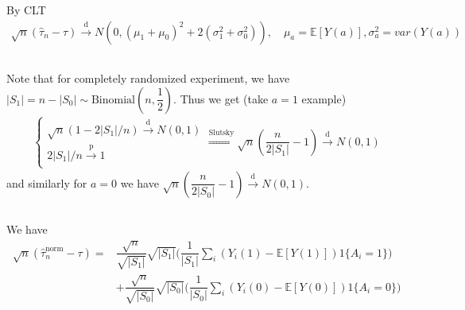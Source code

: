 \documentclass[11pt,a4paper]{ctexart}
\numberwithin{equation}{section}%
\begin{document}
By CLT
\begin{align*}
    \sqrt{n}(\hat{\tau}_n-\tau) \xrightarrow[]{\mathrm{d}} N(0, (\mu _1 + \mu _0)^2 + 2(\sigma _1^2 + \sigma _0^2)),\quad \mu _a = \mathbb{E}\left[ Y(a) \right],\sigma _a^2 = var(Y(a))
\end{align*}



\subsection{}







Note that for completely randomized experiment, we have $ \left\vert S_1 \right\vert = n- \left\vert S_0 \right\vert \sim \mathrm{ Binomial }(n, \dfrac{ 1 }{ 2 }) $. Thus we get (take $ a=1 $ example)
\begin{align*}
    \begin{cases}
        \sqrt{n}(1-2\left\vert S_1 \right\vert /n ) \xrightarrow[]{\mathrm{d}} N(0, 1)\\
        2\left\vert S_1 \right\vert /n \xrightarrow[]{\mathrm{p}} 1
    \end{cases} \mathop{  \Rightarrow  }\limits^{\mathrm{ Slutsky }} \sqrt{n}(\dfrac{ n  }{ 2\left\vert S_1\right\vert }    -1 ) \xrightarrow[]{\mathrm{d}} N(0, 1)  
\end{align*}
and similarly for $ a=0 $ we have $ \sqrt{n}(\dfrac{ n  }{ 2\left\vert S_0\right\vert }    -1 ) \xrightarrow[]{\mathrm{d}} N(0, 1)  $.




\subsection{}


We have
\begin{align*}
    \sqrt{n}(\hat{\tau}_n^\mathrm{ norm } -\tau) = &\dfrac{ \sqrt{n} }{ \sqrt{\left\vert S_1 \right\vert } }  \sqrt{\left\vert S_1 \right\vert } \big( \dfrac{ 1 }{ \left\vert S_1 \right\vert  }\sum_i (Y_i(1) - \mathbb{E}\left[ Y(1) \right] )1\{A_i=1\}    \big) \\ & + \dfrac{ \sqrt{n} }{ \sqrt{\left\vert S_0 \right\vert } }  \sqrt{\left\vert S_0 \right\vert } \big( \dfrac{ 1 }{ \left\vert S_0 \right\vert  }\sum_i (Y_i(0) - \mathbb{E}\left[ Y(0) \right] )1\{A_i=0\}    \big)
\end{align*}
\end{document}
